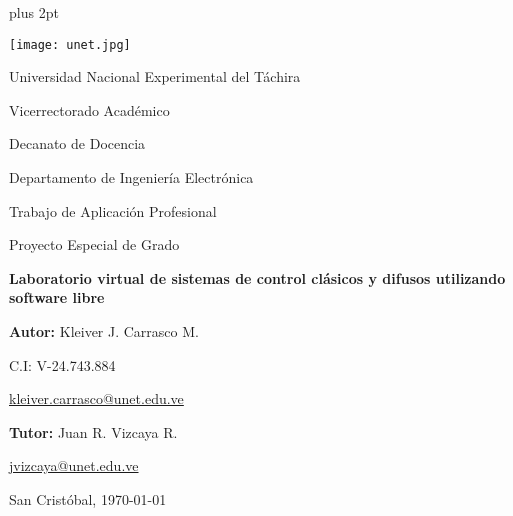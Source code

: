 \begin{titlepage}
\parskip=7.25pt plus 2pt
\begin{center}
	\texttt{[image: unet.jpg]}
	
	Universidad Nacional Experimental del Táchira 
	
	Vicerrectorado Académico
	
	Decanato de Docencia
	
	Departamento de Ingeniería Electrónica
	
	Trabajo de Aplicación Profesional
	
	Proyecto Especial de Grado
\end{center}

\centering
	\vspace{2.5cm}
	\vfill
	{\Large \textbf{Laboratorio virtual de sistemas de control clásicos y difusos utilizando software libre}\par}

\vfill
\begin{flushright}
	\begin{spacing}{1.5}
		\textbf{Autor:} Kleiver J. Carrasco M.
		
		C.I: V-24.743.884
		
		\href{kleiver.carrasco@unet.edu.ve}{kleiver.carrasco@unet.edu.ve}
		
		\textbf{Tutor:} Juan R. Vizcaya R.
		
		\href{jvizcaya@unet.edu.ve}{jvizcaya@unet.edu.ve}
	\end{spacing}	
\end{flushright}

\vfill
	San Cristóbal, \monthyeardate\today
\leavevmode
\end{titlepage}